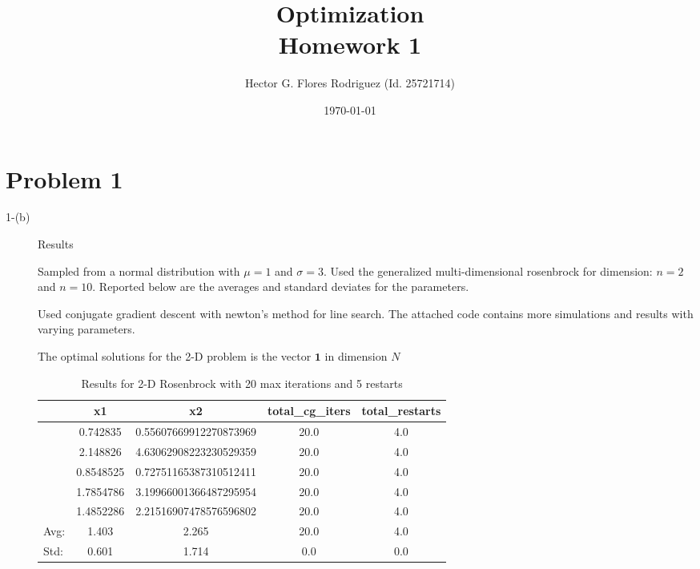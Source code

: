 \documentclass[10pt,onside]{article}
\title{\blue Optimization \\
\blueb Homework 1}
\author{Hector G. Flores Rodriguez (Id. 25721714)}
\date{\today} %
\begin{document}
\maketitle

\section{Problem 1}
\begin{description}
\item[1-(b)] Results

Sampled from a normal distribution with $\mu=1$ and $\sigma=3$. Used the generalized multi-dimensional rosenbrock for dimension: $n=2$ and $n=10$. Reported below are the averages and standard deviates for the parameters.

Used conjugate gradient descent with newton's method for line search. The attached code contains more simulations and results with varying parameters.

The optimal solutions for the 2-D problem is the vector $\mathbf{1}$ in dimension $N$

\begin {table}[ht]
\centering
\caption {Results for 2-D Rosenbrock with 20 max iterations and 5 restarts}
\begin{tabular}{lcccc}
\toprule
{} &                      x1 &                      x2 &  total\_cg\_iters &  total\_restarts \\
\midrule
&  0.742835 &  0.55607669912270873969 &            20.0 &             4.0 \\
&  2.148826 &  4.63062908223230529359 &            20.0 &             4.0 \\
&  0.8548525 &  0.72751165387310512411 &            20.0 &             4.0 \\
&  1.7854786 &  3.19966001366487295954 &            20.0 &             4.0 \\
&  1.4852286 &  2.21516907478576596802 &            20.0 &             4.0 \\
\bottomrule
Avg: & 1.403 & 2.265 & 20.0 & 4.0 \\
Std: & 0.601 & 1.714 & 0.0 & 0.0 \\
\bottomrule
\end{tabular}
\end{table}


\end{description}
\end{document}
